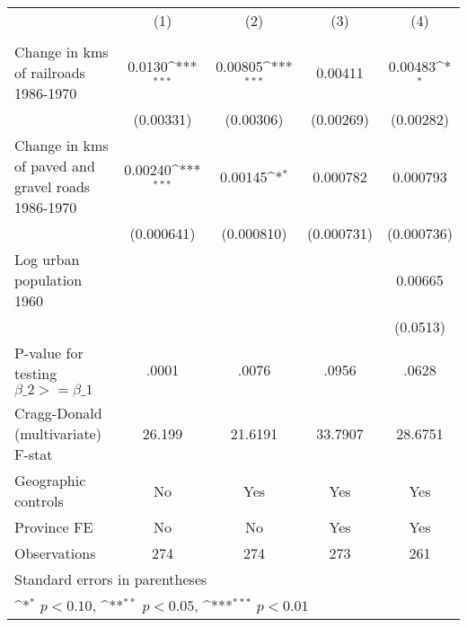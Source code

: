 {
\def\sym#1{\ifmmode^{#1}\else\(^{#1}\)\fi}
\begin{tabular}{l*{4}{c}}
\hline\hline
                &\multicolumn{1}{c}{(1)}&\multicolumn{1}{c}{(2)}&\multicolumn{1}{c}{(3)}&\multicolumn{1}{c}{(4)}\\
                &\multicolumn{1}{c}{}&\multicolumn{1}{c}{}&\multicolumn{1}{c}{}&\multicolumn{1}{c}{}\\
\hline
Change in kms of railroads 1986-1970&   0.0130\sym{***}&  0.00805\sym{***}&  0.00411         &  0.00483\sym{*}  \\
                &(0.00331)         &(0.00306)         &(0.00269)         &(0.00282)         \\
[1em]
Change in kms of paved and gravel roads 1986-1970&  0.00240\sym{***}&  0.00145\sym{*}  & 0.000782         & 0.000793         \\
                &(0.000641)         &(0.000810)         &(0.000731)         &(0.000736)         \\
[1em]
Log urban population 1960&                  &                  &                  &  0.00665         \\
                &                  &                  &                  & (0.0513)         \\
\hline
P-value for testing $\beta\_{2} >= \beta\_{1}$&    .0001         &    .0076         &    .0956         &    .0628         \\
Cragg-Donald (multivariate) F-stat&   26.199         &  21.6191         &  33.7907         &  28.6751         \\
Geographic controls&       No         &      Yes         &      Yes         &      Yes         \\
Province FE     &       No         &       No         &      Yes         &      Yes         \\
Observations    &      274         &      274         &      273         &      261         \\
\hline\hline
\multicolumn{5}{l}{\footnotesize Standard errors in parentheses}\\
\multicolumn{5}{l}{\footnotesize \sym{*} \(p<0.10\), \sym{**} \(p<0.05\), \sym{***} \(p<0.01\)}\\
\end{tabular}
}
